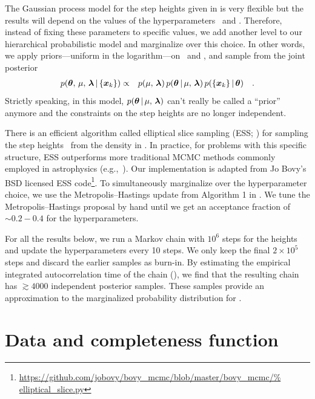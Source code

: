 The Gaussian process model for the step heights given in  is very
flexible but the results will depend on the values of the hyperparameters
\mean\ and \smoothpars.
Therefore, instead of fixing these parameters to specific values, we add
another level to our hierarchical probabilistic model and marginalize over
this choice.
In other words, we apply priors---uniform in the logarithm---on \mean\ and
\smoothpars, and sample from the joint posterior
\begin{eqnarray} \eqlabel{joint-posterior}
p(\ratepars,\,\mean,\,\smoothpars\,|\,\{\data_k\}) &\propto&
    p(\mean,\,\smoothpars)\,p(\ratepars\,|\,\mean,\,\smoothpars)\,
    p(\{\data_k\}\,|\,\ratepars) \quad.
\end{eqnarray}
Strictly speaking, in this model, $p({\boldsymbol{{\theta}}}\,|\,{\mu},\,{\boldsymbol{{\lambda}}})$ can't
really be called a ``prior'' anymore and the constraints on the step heights
are no longer independent.

There is an efficient algorithm called elliptical slice sampling (ESS;
\citealt{Murray:2010, Murray:2010a}) for sampling the step heights \ratepars\
from the density in .
In practice, for problems with this specific structure, ESS outperforms more
traditional MCMC methods commonly employed in astrophysics
(e.g.,~\citealt{Foreman-Mackey:2013}).
Our implementation is adapted from Jo Bovy's BSD licensed ESS
code\footnote{\url{https://github.com/jobovy/bovy_mcmc/blob/master/bovy_mcmc/%
elliptical_slice.py}}.
To simultaneously marginalize over the hyperparameter choice, we use the
Metropolis--Hastings update from Algorithm 1 in \citet{Murray:2010a}.
We tune the Metropolis--Hastings proposal by hand until we get an acceptance
fraction of $\sim0.2-0.4$ for the hyperparameters.

For all the results below, we run a Markov chain with $10^6$ steps for the
heights and update the hyperparameters every 10 steps.
We only keep the final $2 \times 10^5$ steps and discard the earlier samples
as burn-in.
By estimating the empirical integrated autocorrelation time of the chain
(\citealt{Goodman:2010}), we find that the resulting chain has $\gtrsim4000$
independent posterior samples.
These samples provide an approximation to the marginalized probability
distribution for \ratepars.

\section{Data and completeness function}

